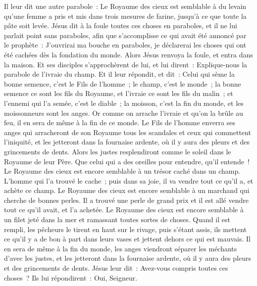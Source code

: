 \begin{multicols}{2}
Il leur dit une autre parabole~: Le Royaume des cieux est semblable à du levain qu'une femme a pris et mis dans trois mesures de farine, jusqu'à ce que toute la pâte soit levée.
Jésus dit à la foule toutes ces choses en paraboles, et il ne lui parlait point sans paraboles,
afin que s'accomplisse ce qui avait été annoncé par le prophète~: J'ouvrirai ma bouche en paraboles, je déclarerai les choses qui ont été cachées dès la fondation du monde.
Alors Jésus renvoya la foule, et entra dans la maison. Et ses disciples s'approchèrent de lui, et lui dirent~: Explique-nous la parabole de l'ivraie du champ.
Et il leur répondit, et dit~: Celui qui sème la bonne semence, c'est le Fils de l'homme~;
le champ, c'est le monde~; la bonne semence ce sont les fils du Royaume, et l'ivraie ce sont les fils du malin~;
et l'ennemi qui l'a semée, c'est le diable~; la moisson, c'est la fin du monde, et les moissonneurs sont les anges.
Or comme on arrache l'ivraie et qu'on la brûle au feu, il en sera de même à la fin de ce monde.
Le Fils de l'homme enverra ses anges qui arracheront de son Royaume tous les scandales et ceux qui commettent l'iniquité,
et les jetteront dans la fournaise ardente, où il y aura des pleurs et des grincements de dents.
Alors les justes resplendiront comme le soleil dans le Royaume de leur Père. Que celui qui a des oreilles pour entendre, qu'il entende~!
Le Royaume des cieux est encore semblable à un trésor caché dans un champ. L'homme qui l'a trouvé le cache~; puis dans sa joie, il va vendre tout ce qu'il a, et achète ce champ.
Le Royaume des cieux est encore semblable à un marchand qui cherche de bonnes perles.
Il a trouvé une perle de grand prix et il est allé vendre tout ce qu'il avait, et l'a achetée.
Le Royaume des cieux est encore semblable à un filet jeté dans la mer et ramassant toutes sortes de choses.
Quand il est rempli, les pêcheurs le tirent en haut sur le rivage, puis s'étant assis, ils mettent ce qu'il y a de bon à part dans leurs vases et jettent dehors ce qui est mauvais.
Il en sera de même à la fin du monde, les anges viendront séparer les méchants d'avec les justes,
et les jetteront dans la fournaise ardente, où il y aura des pleurs et des grincements de dents.
Jésus leur dit~: Avez-vous compris toutes ces choses~? Ils lui répondirent~: Oui, Seigneur.

\end{multicols}
